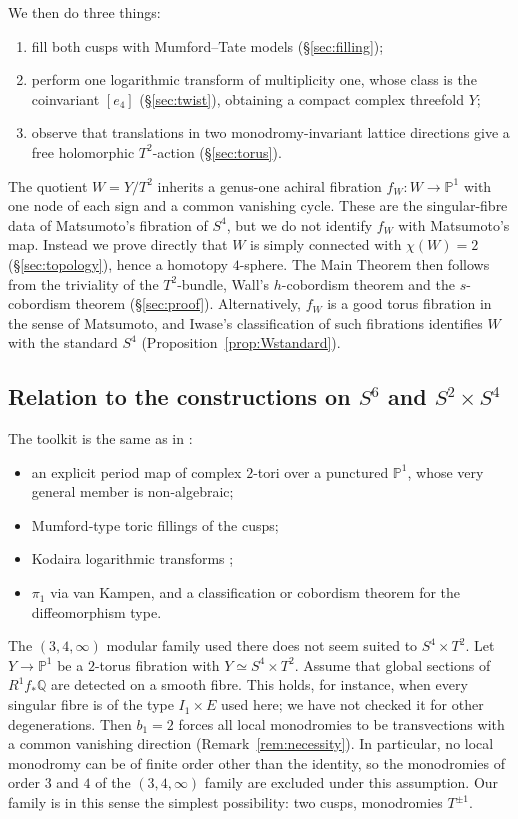 \documentclass{article}
\theoremstyle{definition}
\theoremstyle{plain}
\newcommand{\Q}{\mathbb{Q}}
\newcommand{\PP}{\mathbb{P}}
\begin{document}
We then do three things:
\begin{enumerate}
\item fill both cusps with Mumford--Tate models (\S\ref{sec:filling});
\item perform one logarithmic transform of multiplicity one, whose class is the
  coinvariant $[e_4]$ (\S\ref{sec:twist}), obtaining a compact complex threefold $Y$;
\item observe that translations in two monodromy-invariant lattice directions give
  a free holomorphic $T^2$-action (\S\ref{sec:torus}).
\end{enumerate}
The quotient $W=Y/T^2$ inherits a genus-one achiral fibration
$f_W\colon W\to\PP^1$ with one node of each sign and a common vanishing cycle. These
are the singular-fibre data of Matsumoto's fibration of $S^4$, but we do not identify
$f_W$ with Matsumoto's map. Instead we prove directly that $W$ is simply connected
with $\chi(W)=2$ (\S\ref{sec:topology}), hence a homotopy $4$-sphere.
The Main Theorem then follows from the triviality of the $T^2$-bundle, Wall's
$h$-cobordism theorem and the $s$-cobordism theorem (\S\ref{sec:proof}).
Alternatively, $f_W$ is a good torus fibration in the sense of Matsumoto, and Iwase's
classification of such fibrations \cite{Iwase84} identifies $W$ with the standard
$S^4$ (Proposition~\ref{prop:Wstandard}).

\subsection{Relation to the constructions on $S^6$ and $S^2\times S^4$}
The toolkit is the same as in \cite{AC26,Engel26,GFL26}:
\begin{itemize}
\item an explicit period map of complex $2$-tori over a punctured $\PP^1$, whose very
  general member is non-algebraic;
\item Mumford-type toric fillings of the cusps;
\item Kodaira logarithmic transforms \cite{Kodaira63};
\item $\pi_1$ via van Kampen, and a classification or cobordism theorem for the
  diffeomorphism type.
\end{itemize}
The $(3,4,\infty)$ modular family used there does not seem suited to $S^4\times T^2$.
Let $Y\to\PP^1$ be a $2$-torus fibration with $Y\simeq S^4\times T^2$. Assume that
global sections of $R^1f_*\Q$ are detected on a smooth fibre. This holds, for instance,
when every singular fibre is of the type $I_1\times E$ used here; we have not checked
it for other degenerations. Then $b_1=2$ forces all local monodromies to be
transvections with a common vanishing direction (Remark~\ref{rem:necessity}). In
particular, no local monodromy can be of finite order other than the identity, so the
monodromies of order $3$ and $4$ of the $(3,4,\infty)$ family are excluded under this
assumption. Our family is in this sense the simplest possibility: two cusps,
monodromies $T^{\pm1}$.
\end{document}

